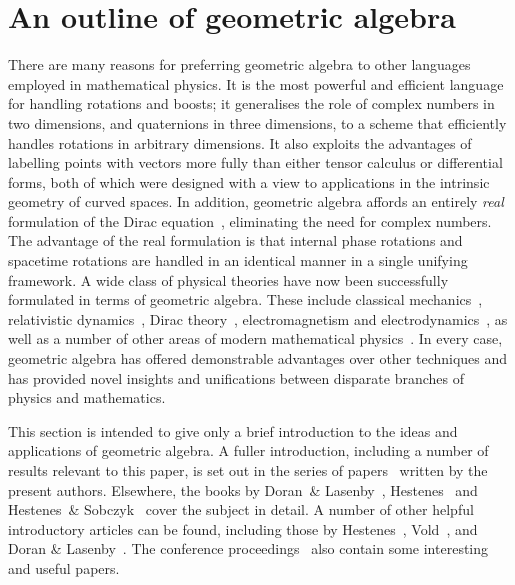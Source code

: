 \documentclass[a4paper]{article}
\numberwithin{equation}{section}
\begin{document}
\section{An outline of geometric algebra}
\label{Outline}

There are many reasons for preferring geometric algebra to other
languages employed in mathematical physics.  It is the most powerful
and efficient language for handling rotations and boosts; it
generalises the role of complex numbers in two dimensions, and
quaternions in three dimensions, to a scheme that efficiently handles
rotations in arbitrary dimensions.  It also exploits the advantages of
labelling points with vectors more fully than either tensor calculus
or differential forms, both of which were designed with a view to
applications in the intrinsic geometry of curved spaces.  In addition,
geometric algebra affords an entirely {\em real\/} formulation of the
Dirac equation~\cite{hes75,DGL93-states}, eliminating the need for
complex numbers.  The advantage of the real formulation is that
internal phase rotations and spacetime rotations are handled in an
identical manner in a single unifying framework.  A wide class of
physical theories have now been successfully formulated in terms of
geometric algebra.  These include classical
mechanics~\cite{hes-nf1,hes74a,vol93}, relativistic
dynamics~\cite{hes74}, Dirac
theory~\cite{hes75,DGL93-states,DGL93-paths,DGL95-elphys},
electromagnetism and
electrodynamics~\cite{DGL93-notreal,DGL93-paths,vol93a}, as well as a
number of other areas of modern mathematical
physics~\cite{DGL93-gras,dor93-spin,DGL93-lft,DGL-polmvl,DGL-polspin}.
In every case, geometric algebra has offered demonstrable advantages
over other techniques and has provided novel insights and unifications
between disparate branches of physics and mathematics.


This section is intended to give only a brief introduction to the
ideas and applications of geometric algebra.  A fuller introduction,
including a number of results relevant to this paper, is set out in
the series of
papers~\cite{DGL93-notreal,DGL93-states,DGL93-paths,DGL93-lft} written
by the present authors.  Elsewhere, the books by Doran~\&
Lasenby~\cite{gap}, Hestenes~\cite{hes-sta,hes-nf1} and Hestenes~\&
Sobczyk~\cite{hes-gc} cover the subject in detail.  A number of other
helpful introductory articles can be found, including those by
Hestenes~\cite{hes-unified,hes91}, Vold~\cite{vol93,vol93a}, and Doran
\& Lasenby~\cite{DL-course}.  The conference
proceedings~\cite{cliffconf1,cliffconf2,cliffconf3} also contain some
interesting and useful papers.
\end{document}
